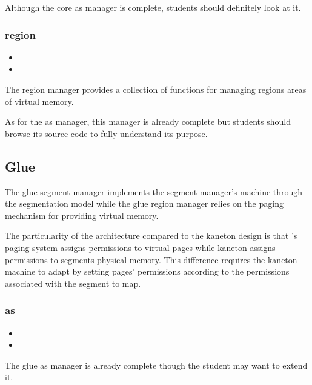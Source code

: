 Although the core as manager is complete, students should definitely look at
it.

\subsubsection*{region}

\begin{itemize}
  \item
  \item
\end{itemize}

The region manager provides a collection of functions for managing regions
\ie{} areas of virtual memory.

As for the as manager, this manager is already complete but students
should browse its source code to fully understand its purpose.

\subsection{Glue}

The glue segment manager implements the segment manager's machine through
the  segmentation model while the glue region manager relies on
the paging mechanism for providing virtual memory.

The particularity of the  architecture compared to the kaneton
design is that 's paging system assigns permissions to virtual
pages while kaneton assigns permissions to segments \ie{} physical memory.
This difference requires the kaneton machine to adapt by setting pages'
permissions according to the permissions associated with the segment to map.

\subsubsection*{as}

\begin{itemize}
  \item
  \item
\end{itemize}

The glue as manager is already complete though the student may want to extend
it.

